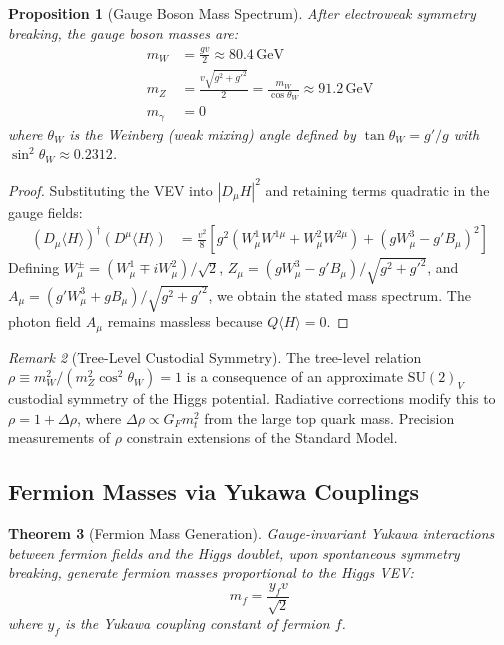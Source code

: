 \documentclass[12pt]{article}
\newtheorem{theorem}{Theorem}[section]
\newtheorem{proposition}[theorem]{Proposition}
\theoremstyle{definition}
\theoremstyle{remark}
\newtheorem{remark}[theorem]{Remark}
\newcommand{\GeV}{\,\mathrm{GeV}}
\begin{document}
\begin{proposition}[Gauge Boson Mass Spectrum]
\label{prop:bosonmasses}
After electroweak symmetry breaking, the gauge boson masses are:
\begin{align}
m_W &= \frac{gv}{2} \approx 80.4\GeV \\
m_Z &= \frac{v\sqrt{g^2 + g'^2}}{2} = \frac{m_W}{\cos\theta_W} \approx 91.2\GeV \\
m_\gamma &= 0
\end{align}
where $\theta_W$ is the Weinberg (weak mixing) angle defined by $\tan\theta_W = g'/g$ with $\sin^2\theta_W \approx 0.2312$.
\end{proposition}

\begin{proof}
Substituting the VEV into $|D_\mu H|^2$ and retaining terms quadratic in the gauge fields:
\begin{align}
(D_\mu \langle H \rangle)^\dagger (D^\mu \langle H \rangle) &= \frac{v^2}{8}\left[g^2 (W^1_\mu W^{1\mu} + W^2_\mu W^{2\mu}) + (g W^3_\mu - g' B_\mu)^2\right]
\end{align}
Defining $W^\pm_\mu = (W^1_\mu \mp i W^2_\mu)/\sqrt{2}$, $Z_\mu = (g W^3_\mu - g' B_\mu)/\sqrt{g^2 + g'^2}$, and $A_\mu = (g' W^3_\mu + g B_\mu)/\sqrt{g^2 + g'^2}$, we obtain the stated mass spectrum. The photon field $A_\mu$ remains massless because $Q \langle H \rangle = 0$.
\end{proof}

\begin{remark}[Tree-Level Custodial Symmetry]
\label{rem:custodial}
The tree-level relation $\rho \equiv m_W^2/(m_Z^2 \cos^2\theta_W) = 1$ is a consequence of an approximate $\mathrm{SU}(2)_V$ custodial symmetry of the Higgs potential. Radiative corrections modify this to $\rho = 1 + \Delta\rho$, where $\Delta\rho \propto G_F m_t^2$ from the large top quark mass. Precision measurements of $\rho$ constrain extensions of the Standard Model.
\end{remark}

\subsection{Fermion Masses via Yukawa Couplings}

\begin{theorem}[Fermion Mass Generation]
\label{thm:fermionmass}
Gauge-invariant Yukawa interactions between fermion fields and the Higgs doublet, upon spontaneous symmetry breaking, generate fermion masses proportional to the Higgs VEV:
\begin{equation}
m_f = \frac{y_f v}{\sqrt{2}}
\end{equation}
where $y_f$ is the Yukawa coupling constant of fermion $f$.
\end{theorem}
\end{document}
